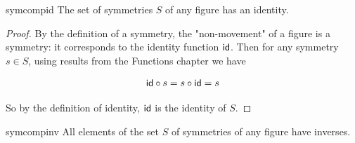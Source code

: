 \begin{prop}{symcompid}
The set of symmetries $S$ of any figure has an identity.
\end{prop}

\begin{proof}
By the definition of a symmetry, the "non-movement" of a figure is a symmetry: it corresponds to the identity function ${\sf{i}d}$.  Then for any symmetry $s \in S$, using results from the Functions chapter we have


$${\sf{i}d} \circ s = s \circ {\sf{i}d} = s$$

So by the definition of identity, ${\sf{i}d}$ is the identity of $S$.  
\end{proof}


\begin{prop}{symcompinv}
All elements of the set $S$ of symmetries of any figure have inverses.
\end{prop}

